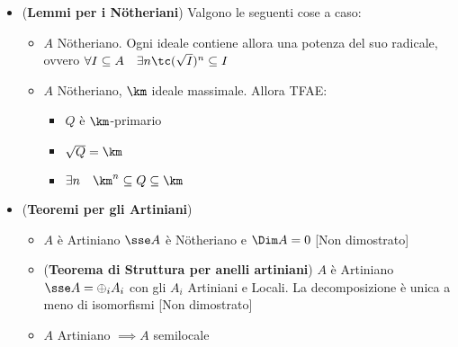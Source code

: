 \documentclass[a4paper,NoNotes,GeneralMath]{stdmdoc}
\begin{document}
\begin{itemize}
\begin{itemize}
			\end{itemize}
		\item ({\bf Lemmi per i Nötheriani}) Valgono le seguenti cose a caso:
			\begin{itemize}
				\item $A$ Nötheriano. Ogni ideale contiene allora una potenza del suo radicale, ovvero $\forall I \subseteq A \quad \exists n \tc (\sqrt{I})^n \subseteq I$
				\item $A$ Nötheriano, $\km$ ideale massimale. Allora TFAE:
					\begin{itemize}
						\item $Q$ è $\km$-primario
						\item $\sqrt{Q} = \km$
						\item $\exists n \quad \km^n \subseteq Q \subseteq \km$
					\end{itemize}
			\end{itemize}
		\item ({\bf Teoremi per gli Artiniani})
			\begin{itemize}
				\item $A$ è Artiniano $\sse A$ è Nötheriano e $\Dim A = 0$ [Non dimostrato]
				\item ({\bf Teorema di Struttura per anelli artiniani}) $A$ è Artiniano $\sse A = \oplus_i A_i$ con gli $A_i$ Artiniani e Locali. La decomposizione è unica a meno di isomorfismi [Non dimostrato]
				\item $A$ Artiniano $\implies A$ semilocale
			\end{itemize}
	\end{itemize}
	
\end{document}

